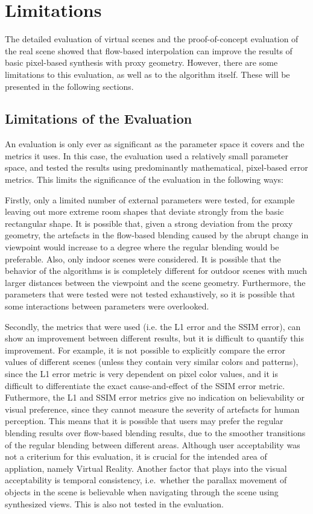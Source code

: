 \section{Limitations}\label{sec:limitations}
The detailed evaluation of virtual scenes and the proof-of-concept evaluation of the real scene showed that flow-based interpolation can improve the results of basic pixel-based synthesis with proxy geometry. However, there are some limitations to this evaluation, as well as to the algorithm itself. These will be presented in the following sections.


\subsection{Limitations of the Evaluation}
An evaluation is only ever as significant as the parameter space it covers and the metrics it uses. In this case, the evaluation used a relatively small parameter space, and tested the results using predominantly mathematical, pixel-based error metrics. This limits the significance of the evaluation in the following ways:

Firstly, only a limited number of external parameters were tested, for example leaving out more extreme room shapes that deviate strongly from the basic rectangular shape. It is possible that, given a strong deviation from the proxy geometry, the artefacts in the flow-based blending caused by the abrupt change in viewpoint would increase to a degree where the regular blending would be preferable. Also, only indoor scenes were considered. It is possible that the behavior of the algorithms is is completely different for outdoor scenes with much larger distances between the viewpoint and the scene geometry. Furthermore, the parameters that were tested were not tested exhaustively, so it is possible that some interactions between parameters were overlooked.

Secondly, the metrics that were used (i.e. the L1 error and the SSIM error), can show an improvement between different results, but it is difficult to quantify this improvement. For example, it is not possible to explicitly compare the error values of different scenes (unless they contain very similar colors and patterns), since the L1 error metric is very dependent on pixel color values, and it is difficult to differentiate the exact cause-and-effect of the SSIM error metric. Futhermore, the L1 and SSIM error metrics give no indication on believability or visual preference, since they cannot measure the severity of artefacts for human perception. This means that it is possible that users may prefer the regular blending results over flow-based blending results, due to the smoother transitions of the regular blending between different areas. Although user acceptability was not a criterium for this evaluation, it is crucial for the intended area of appliation, namely Virtual Reality. Another factor that plays into the visual acceptability is temporal consistency, i.e.\ whether the parallax movement of objects in the scene is believable when navigating through the scene using synthesized views. This is also not tested in the evaluation.

